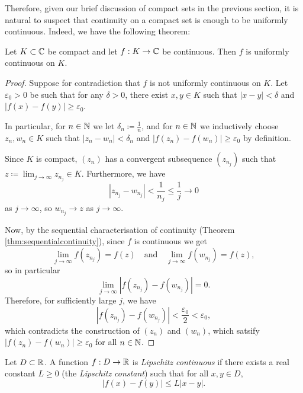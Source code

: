 \documentclass[../analysis1.tex]{subfiles}
\begin{document}
Therefore, given our brief discussion of compact sets in the previous section, it is natural to suspect that continuity on a compact set is enough to be uniformly continuous. Indeed, we have the following theorem:

\begin{theorem}
\label{thm:heine}
    \begin{shaded*}
        Let $K\subset\mathbb{C}$ be compact and let $f:K\to\mathbb{C}$ be continuous. Then $f$ is uniformly continuous on $K$.
    \end{shaded*}
\end{theorem}
\begin{proof}
    Suppose for contradiction that $f$ is not uniformly continuous on $K$. Let $\varepsilon_0>0$ be such that for any $\delta>0$, there exist $x,y\in K$ such that $|x-y|<\delta$ and $|f(x)-f(y)|\ge \varepsilon_0$.

    In particular, for $n\in\mathbb{N}$ we let $\delta_n\coloneqq\frac{1}{n}$, and for $n\in\mathbb{N}$ we inductively choose $z_n,w_n\in K$ such that $|z_n-w_n|<\delta_n$ and $|f(z_n)-f(w_n)|\ge \varepsilon_0$ by definition.

    Since $K$ is compact, $(z_n)$ has a convergent subsequence $(z_{n_j})$ such that $z\coloneqq \lim_{j\to\infty}z_{n_j}\in K$. Furthermore, we have
    \[|z_{n_j}-w_{n_j}|<\frac{1}{n_j}\le \frac{1}{j}\to 0\]
    as $j\to\infty$, so $w_{n_j}\to z$ as $j\to\infty$.

    Now, by the sequential characterisation of continuity (Theorem \ref{thm:sequentialcontinuity}), since $f$ is continuous we get
    \[\lim_{j\to\infty}f(z_{n_j})=f(z)\quad\text{and}\quad \lim_{j\to\infty}f(w_{n_j})=f(z),\]
    so in particular
    \[\lim_{j\to\infty}|f(z_{n_j})-f(w_{n_j})|=0.\]
    Therefore, for sufficiently large $j$, we have
    \[|f(z_{n_j})-f(w_{n_j})|<\frac{\varepsilon_0}{2}<\varepsilon_0,\]
    which contradicts the construction of $(z_n)$ and $(w_n)$, which satsify $|f(z_n)-f(w_n)|\ge\varepsilon_0$ for all $n\in\mathbb{N}$.\qedhere
\end{proof}

\begin{definition}
    \begin{shaded*}
        Let $D\subset\mathbb{R}$. A function $f: D \to \mathbb{R}$ is \textit{Lipschitz continuous} if there exists a real constant $L \ge 0$ (the \textit{Lipschitz constant}) such that for all $x, y \in D$,
        \[ |f(x) - f(y)| \le L|x - y|. \]
    \end{shaded*}
\end{definition}
\end{document}
